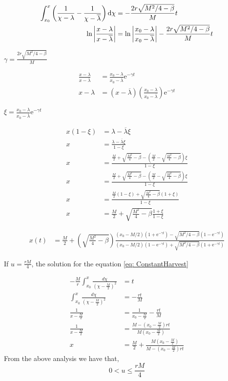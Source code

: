 \begin{align*}
\int_{x_0}^{x} \left(\frac{1}{\chi - \lambda}-\frac{1}{\chi - \overline{\lambda}}\right)\mathrm{d} \chi &=-\frac{2r\sqrt{M^2/4-\beta}}{M}t \\
	\ln\left|\frac{x - \lambda}{x - \overline{\lambda}}\right|&=\ln\left|\frac{x_0- \lambda}{x_0 - \overline{\lambda}}\right|-\frac{2r\sqrt{M^2/4-\beta}}{M}t
\end{align*}
	
$\gamma=\frac{2r\sqrt{M^2/4-\beta}}{M}$

\begin{align}
\frac{x - \lambda}{x - \overline{\lambda}} &=\frac{x_0- \lambda}{x_0- \overline{\lambda}}\mathrm e^{-\gamma t} \\
x-\lambda &=\left(x-\overline{\lambda}\right)\left(\frac{x_0- \lambda}{x_0- \overline{\lambda}}\right)\mathrm e^{-\gamma t}
\end{align}

$\xi=\frac{x_0-\lambda}{x_0-\overline{\lambda}}\mathrm{e}^{-\gamma t}$

\begin{align*}
	x\left(1-\xi\right)&=\lambda-\overline{\lambda}\xi\\
	x&=\frac{\lambda-\overline{\lambda}\xi}{1-\xi} \\	
	x&=\frac{\frac{M}{2}+\sqrt{\frac{M^2}{4}-\beta}-\left(\frac{M}{2}-\sqrt{\frac{M^2}{4}-\beta}\right)\xi}{1-\xi}\\
	x&=\frac{\frac{M}{2}+\sqrt{\frac{M^2}{4}-\beta}-\left(\frac{M}{2}-\sqrt{\frac{M^2}{4}-\beta}\right)\xi}{1-\xi}\\
	x&=\frac{\frac{M}{2}\left(1-\xi\right)+\sqrt{\frac{M^2}{4}-\beta}\left(1+\xi\right)}{1-\xi}\\
	x&=\frac{M}{2}+\sqrt{\frac{M^2}{4}-\beta}\frac{1+\xi}{1-\xi}
\end{align*}

\begin{align}
	x(t)&=\frac{M}{2}+\left(\sqrt{\frac{M^2}{4}-\beta}\right)\frac{\left(x_0-M/2\right)\left(1+\mathrm e^{-\gamma t}\right)-\sqrt{M^2/4-\beta}\left(1-\mathrm{e}^{-\gamma t}\right)}{\left(x_0-M/2\right)\left(1-\mathrm e^{-\gamma t}\right)+\sqrt{M^2/4-\beta}\left(1+\mathrm{e}^{-\gamma t}\right)} \label{eq: Time Expression for Harvest}
\end{align}

If $u=\frac{rM}{4}$, the solution for the equation \ref{eq: ConstantHarvest}

\begin{align}
-\frac{M}{r}\int_{x_0}^{x}\frac{d\chi}{\left(\chi-\frac{M}{2}\right)^2}&=t\\
\int_{x_0}^{x}\frac{d\chi}{\left(\chi-\frac{M}{2}\right)^2}&=-\frac{rt}{M}\\
\frac{1}{x-\frac{M}{2}}&=\frac{1}{x_0-\frac{M}{2}}-\frac{rt}{M}\\
\frac{1}{x-\frac{M}{2}}&=\frac{M-\left(x_0-\frac{M}{2}\right)rt}{M\left(x_0-\frac{M}{2}\right)} \\
x&=\frac{M}{2}+\frac{M\left(x_0-\frac{M}{2}\right)}{M-\left(x_0-\frac{M}{2}\right)rt}
\end{align}
From the above analysis we have that,
\begin{equation}
0<u\leq\frac{rM}{4}
\end{equation}
